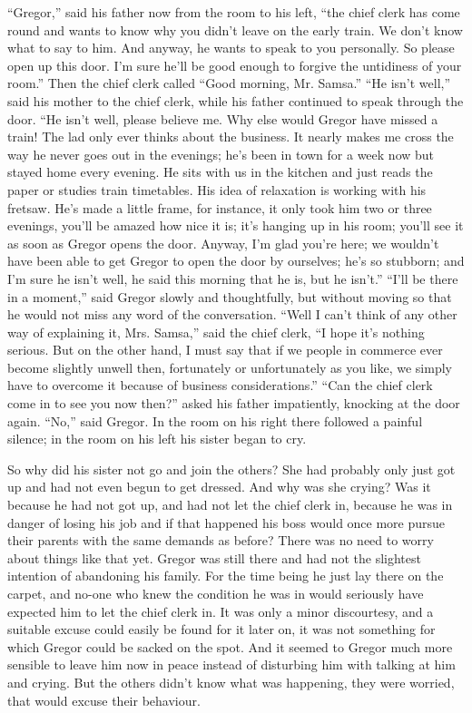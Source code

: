 \documentclass[12pt]{report}
\begin{document}
``Gregor,'' said his father now from the room to his left, ``the chief
clerk has come round and wants to know why you didn't leave on the early
train. We don't know what to say to him. And anyway, he wants to speak
to you personally. So please open up this door. I'm sure he'll be good
enough to forgive the untidiness of your room.'' Then the chief clerk
called ``Good morning, Mr. Samsa.'' ``He isn't well,'' said his mother
to the chief clerk, while his father continued to speak through the
door. ``He isn't well, please believe me. Why else would Gregor have
missed a train! The lad only ever thinks about the business. It nearly
makes me cross the way he never goes out in the evenings; he's been in
town for a week now but stayed home every evening. He sits with us in
the kitchen and just reads the paper or studies train timetables. His
idea of relaxation is working with his fretsaw. He's made a little
frame, for instance, it only took him two or three evenings, you'll be
amazed how nice it is; it's hanging up in his room; you'll see it as
soon as Gregor opens the door. Anyway, I'm glad you're here; we wouldn't
have been able to get Gregor to open the door by ourselves; he's so
stubborn; and I'm sure he isn't well, he said this morning that he is,
but he isn't.'' ``I'll be there in a moment,'' said Gregor slowly and
thoughtfully, but without moving so that he would not miss any word of
the conversation. ``Well I can't think of any other way of explaining
it, Mrs. Samsa,'' said the chief clerk, ``I hope it's nothing serious.
But on the other hand, I must say that if we people in commerce ever
become slightly unwell then, fortunately or unfortunately as you like,
we simply have to overcome it because of business considerations.''
``Can the chief clerk come in to see you now then?'' asked his father
impatiently, knocking at the door again. ``No,'' said Gregor. In the
room on his right there followed a painful silence; in the room on his
left his sister began to cry.

So why did his sister not go and join the others? She had probably only
just got up and had not even begun to get dressed. And why was she
crying? Was it because he had not got up, and had not let the chief
clerk in, because he was in danger of losing his job and if that
happened his boss would once more pursue their parents with the same
demands as before? There was no need to worry about things like that
yet. Gregor was still there and had not the slightest intention of
abandoning his family. For the time being he just lay there on the
carpet, and no-one who knew the condition he was in would seriously have
expected him to let the chief clerk in. It was only a minor discourtesy,
and a suitable excuse could easily be found for it later on, it was not
something for which Gregor could be sacked on the spot. And it seemed to
Gregor much more sensible to leave him now in peace instead of
disturbing him with talking at him and crying. But the others didn't
know what was happening, they were worried, that would excuse their
behaviour.
\end{document}
